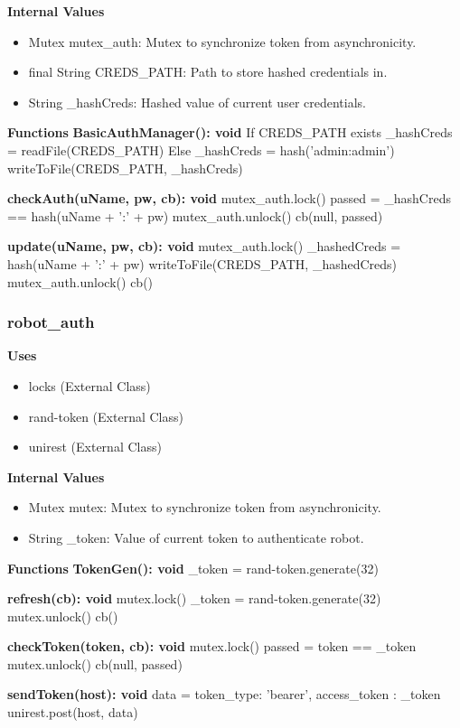 \documentclass [10pt]{article}
\begin{document}
\textbf{Internal Values}
\begin{itemize}
	\item Mutex mutex\_auth: Mutex to synchronize token from asynchronicity.
	\item final String CREDS\_PATH: Path to store hashed credentials in.
	\item String \_hashCreds: Hashed value of current user credentials.
\end{itemize}

\textbf{Functions}
\textbf{BasicAuthManager(): void}
If CREDS\_PATH exists
	\_hashCreds = readFile(CREDS\_PATH)
Else
	\_hashCreds = hash('admin:admin')
	writeToFile(CREDS\_PATH, \_hashCreds)

\textbf{checkAuth(uName, pw, cb): void}
mutex\_auth.lock()
passed = \_hashCreds == hash(uName + ':' + pw)
mutex\_auth.unlock()
cb(null, passed)

\textbf{update(uName, pw, cb): void}
mutex\_auth.lock()
\_hashedCreds =  hash(uName + ':' + pw)
writeToFile(CREDS\_PATH, \_hashedCreds)
mutex\_auth.unlock()
cb()

\subsubsection{robot\_auth}
\textbf{Uses}
\begin{itemize}
	\item locks (External Class)
	\item rand-token (External Class)
	\item unirest (External Class)
\end{itemize}

\textbf{Internal Values}
\begin{itemize}
	\item Mutex mutex: Mutex to synchronize token from asynchronicity.
	\item String \_token: Value of current token to authenticate robot.
\end{itemize}

\textbf{Functions}
\textbf{TokenGen(): void}
\_token = rand-token.generate(32)

\textbf{refresh(cb): void}
mutex.lock()
\_token = rand-token.generate(32)
mutex.unlock()
cb()

\textbf{checkToken(token, cb): void}
mutex.lock()
passed = token == \_token
mutex.unlock()
cb(null, passed)

\textbf{sendToken(host): void}
data = {
	token\_type: 'bearer',
	access\_token : \_token
}
unirest.post(host, data)
\end{document}
